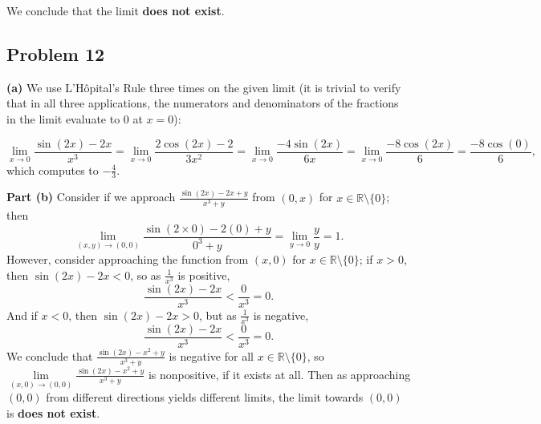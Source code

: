 \documentclass[11pt]{article}
\begin{document}
We conclude that the limit \textbf{does not exist}.


\subsection{Problem 12}

\textbf{(a)} We use L'Hôpital's Rule three times on the given limit (it is trivial to verify that in all three applications, the numerators and denominators of the fractions in the limit evaluate to $0$ at $x = 0$):

\[
	\lim\limits_{x \to 0} \frac{\sin(2x) - 2x}{x^{3}} = \lim\limits_{x \to 0} \frac{2\cos(2x) - 2}{3x^{2}} = \lim\limits_{x \to 0} \frac{-4\sin(2x)}{6x} = \lim\limits_{x \to 0} \frac{-8\cos(2x)}{6} = \frac{-8 \cos(0)}{6},
\]
which computes to $- \frac{4}{3}$.

\textbf{Part (b)} Consider if we approach $\tfrac{\sin(2x) - 2 x + y}{x^{3} + y}$ from $(0, x)$ for $x \in \mathbb{R} \setminus \{ 0 \}$; then 
\[
	\lim\limits_{(x, y) \to (0, 0)} \frac{\sin(2 \times 0) - 2(0) + y}{0^{3} + y} = \lim\limits_{y \to 0} \frac{y}{y} = 1.
\]
However, consider approaching the function from $(x, 0)$ for $x \in \mathbb{R} \setminus \{ 0 \}$; if $x > 0$, then $\sin(2x) - 2x < 0$, so as $\tfrac{1}{x^{3}}$ is positive,
\[
	\frac{\sin(2x) - 2x}{x^{3}} < \frac{0}{x^{3}} = 0.
\]
And if $x < 0$, then $\sin(2x) - 2x > 0$, but as $\tfrac{1}{x^{3}}$ is negative,
\[
	\frac{\sin(2x) - 2x}{x^{3}} < \frac{0}{x^{3}} = 0.
\]
We conclude that $\tfrac{\sin(2x) - x^{2} + y}{x^{3} + y}$ is negative for all $x \in \mathbb{R} \setminus \{ 0 \}$, so $\lim\limits_{(x, 0) \to (0, 0)} \frac{\sin(2x) - x^{2} + y}{x^{3} + y}$ is nonpositive, if it exists at all. Then as approaching $(0, 0)$ from different directions yields different limits, the limit towards $(0, 0)$ is \textbf{does not exist}.
\end{document}
